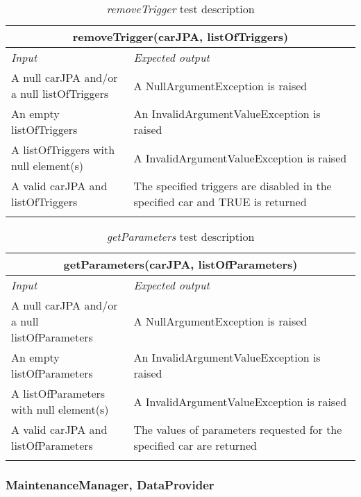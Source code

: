 \clearpage

\begin{longtable}{p{0.35\linewidth}p{0.65\linewidth}}
\multicolumn{2}{c}{\textbf{removeTrigger(carJPA, listOfTriggers)}} \\
\toprule
\emph{Input} & \emph{Expected output} \\
\midrule
A null carJPA and/or a null listOfTriggers & A NullArgumentException is raised\\
\midrule
An empty listOfTriggers & An InvalidArgumentValueException is raised \\
\midrule
A listOfTriggers with null element(s) & A InvalidArgumentValueException is raised\\
\midrule
A valid carJPA and listOfTriggers & The specified triggers are disabled in the specified car and TRUE is returned \\
\bottomrule
\caption{\emph{removeTrigger} test description}
\end{longtable}

\begin{longtable}{p{0.35\linewidth}p{0.65\linewidth}}
\multicolumn{2}{c}{\textbf{getParameters(carJPA, listOfParameters)}} \\
\toprule
\emph{Input} & \emph{Expected output} \\
\midrule
A null carJPA and/or a null listOfParameters & A NullArgumentException is raised\\
\midrule
An empty listOfParameters & An InvalidArgumentValueException is raised \\
\midrule
A listOfParameters with null element(s) & A InvalidArgumentValueException is raised\\
\midrule
A valid carJPA and listOfParameters & The values of parameters requested for the specified car are returned \\
\bottomrule
\caption{\emph{getParameters} test description}
\end{longtable}

\clearpage

\subsubsection{MaintenanceManager, DataProvider}

